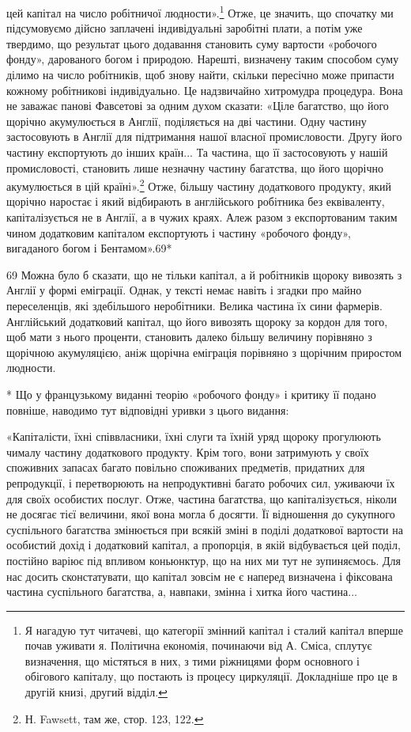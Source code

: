 \parcont{}  %
цей капітал на число робітничої людности».\footnote{
Я нагадую тут читачеві, що категорії змінний капітал і сталий
капітал вперше почав уживати я. Політична економія, починаючи від
А. Сміса, сплутує визначення, що містяться в них, з тими ріжницями
форм основного і обігового капіталу, що постають із процесу циркуляції.
Докладніше про це в другій книзі, другий відділ.
} Отже, це значить,
що спочатку ми підсумовуємо дійсно заплачені індивідуальні
заробітні плати, а потім уже твердимо, що результат цього додавання
становить суму вартости «робочого фонду», дарованого
богом і природою. Нарешті, визначену таким способом суму
ділимо на число робітників, щоб знову найти, скільки пересічно
може припасти кожному робітникові індивідуально. Це надзвичайно
хитромудра процедура. Вона не заважає панові Фавсетові
за одним духом сказати: «Ціле багатство, що його щорічно
акумулюється в Англії, поділяється на дві частини. Одну
частину застосовують в Англії для підтримання нашої власної
промисловости. Другу його частину експортують до інших
країн... Та частина, що її застосовують у нашій промисловості,
становить лише незначну частину багатства, що його щорічно
акумулюється в цій країні».\footnote{
Н. Fawsett, там же, стор. 123, 122.
} Отже, більшу частину додаткового
продукту, який щорічно наростає і який відбирають в англійського
робітника без еквіваленту, капіталізується не в Англії,
а в чужих краях. Алеж разом з експортованим таким чином
додатковим капіталом експортують і частину «робочого фонду»,
вигаданого богом і Бентамом».69*

69    Можна було б сказати, що не тільки капітал, а й робітників щороку
вивозять з Англії у формі еміграції. Однак, у тексті немає навіть і згадки
про майно переселенців, які здебільшого неробітники. Велика частина
їх сини фармерів. Англійський додатковий капітал, що його вивозять
щороку за кордон для того, щоб мати з нього проценти, становить далеко
більшу величину порівняно з щорічною акумуляцією, аніж щорічна
еміграція порівняно з щорічним приростом людности.

* Що у французькому виданні теорію «робочого фонду» і критику
її подано повніше, наводимо тут відповідні уривки з цього видання:

«Капіталісти, їхні співвласники, їхні слуги та їхній уряд щороку
прогулюють чималу частину додаткового продукту. Крім того, вони
затримують у своїх споживних запасах багато повільно споживаних
предметів, придатних для репродукції, і перетворюють на непродуктивні
багато робочих сил, уживаючи їх для своїх особистих послуг.
Отже, частина багатства, що капіталізується, ніколи не досягає тієї
величини, якої вона могла б досягти. Її відношення до сукупного суспільного
багатства змінюється при всякій зміні в поділі додаткової вартости
на особистий дохід і додатковий капітал, а пропорція, в якій відбувається
цей поділ, постійно варіює під впливом коньюнктур, що на них ми
тут не зупиняємось. Для нас досить сконстатувати, що капітал зовсім
не є наперед визначена і фіксована частина суспільного багатства, а,
навпаки, змінна і хитка його частина...

